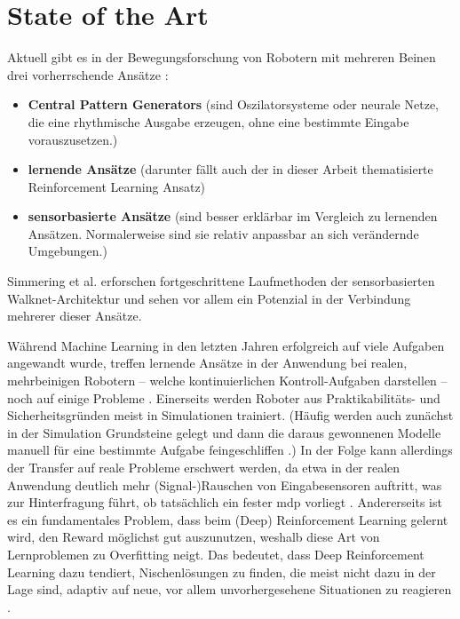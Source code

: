 \chapter{State of the Art}
Aktuell gibt es in der Bewegungsforschung von Robotern mit mehreren Beinen drei vorherrschende Ansätze \cite{simmering2023walknet}:
\begin{itemize}
    \item \textbf{Central Pattern Generators} (sind Oszilatorsysteme oder neurale Netze, die eine rhythmische Ausgabe erzeugen, ohne eine bestimmte Eingabe vorauszusetzen.)
    \item \textbf{lernende Ansätze} (darunter fällt auch der in dieser Arbeit thematisierte Reinforcement Learning Ansatz)
    \item \textbf{sensorbasierte Ansätze} (sind besser erklärbar im Vergleich zu lernenden Ansätzen. Normalerweise sind sie relativ anpassbar an sich verändernde Umgebungen.)
\end{itemize}
Simmering et al. \cite{simmering2023walknet} erforschen fortgeschrittene Laufmethoden der sensorbasierten Walknet-Architektur und sehen vor allem ein Potenzial in der Verbindung mehrerer dieser Ansätze.

Während Machine Learning in den letzten Jahren erfolgreich auf viele Aufgaben angewandt wurde, treffen lernende Ansätze in der Anwendung bei realen, mehrbeinigen Robotern -- welche kontinuierlichen Kontroll-Aufgaben darstellen -- noch auf einige Probleme \cite{schilling2020decentralized}.
Einerseits werden Roboter aus Praktikabilitäts- und Sicherheitsgründen meist in Simulationen trainiert.
(Häufig werden auch zunächst in der Simulation Grundsteine gelegt und dann die daraus gewonnenen Modelle manuell für eine bestimmte Aufgabe feingeschliffen \cite{schilling2020decentralized}.)
In der Folge kann allerdings der Transfer auf reale Probleme erschwert werden, da etwa in der realen Anwendung deutlich mehr (Signal-)Rauschen von Eingabesensoren auftritt, was zur Hinterfragung führt, ob tatsächlich ein fester \ac{mdp} vorliegt \cite{schilling2020decentralized}.
Andererseits ist es ein fundamentales Problem, dass beim (Deep) Reinforcement Learning gelernt wird, den Reward möglichst gut auszunutzen, weshalb diese Art von Lernproblemen zu Overfitting neigt.
Das bedeutet, dass Deep Reinforcement Learning dazu tendiert, Nischenlösungen zu finden, die meist nicht dazu in der Lage sind, adaptiv auf neue, vor allem unvorhergesehene Situationen zu reagieren \cite{schilling2020decentralized}.

